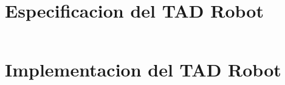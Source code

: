 \begin{appendices}
  \chapter{Especificacion del TAD Robot}
  \vspace{-20pt}
  \inputminted{cpp}{code/Robot.hpp}

  \chapter{Implementacion del TAD Robot}
  \vspace{-20pt}
  \inputminted{cpp}{code/Robot.cpp}
\end{appendices}
